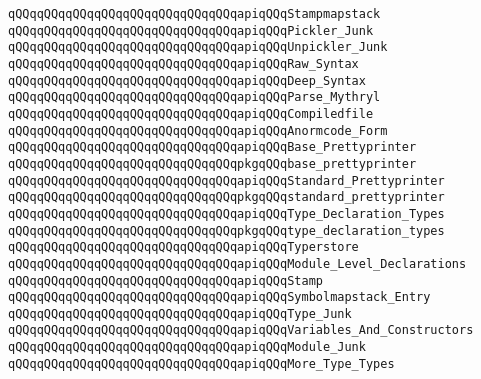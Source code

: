 \verb|qQQqqQQqqQQqqQQqqQQqqQQqqQQqqQQqapiqQQqStampmapstack|\newline
\verb|qQQqqQQqqQQqqQQqqQQqqQQqqQQqqQQqapiqQQqPickler_Junk|\newline
\verb|qQQqqQQqqQQqqQQqqQQqqQQqqQQqqQQqapiqQQqUnpickler_Junk|\newline
\verb|qQQqqQQqqQQqqQQqqQQqqQQqqQQqqQQqapiqQQqRaw_Syntax|\newline
\verb|qQQqqQQqqQQqqQQqqQQqqQQqqQQqqQQqapiqQQqDeep_Syntax|\newline
\verb|qQQqqQQqqQQqqQQqqQQqqQQqqQQqqQQqapiqQQqParse_Mythryl|\newline
\verb|qQQqqQQqqQQqqQQqqQQqqQQqqQQqqQQqapiqQQqCompiledfile|\newline
\verb|qQQqqQQqqQQqqQQqqQQqqQQqqQQqqQQqapiqQQqAnormcode_Form|\newline
\newline
\verb|qQQqqQQqqQQqqQQqqQQqqQQqqQQqqQQqapiqQQqBase_Prettyprinter|\newline
\verb|qQQqqQQqqQQqqQQqqQQqqQQqqQQqqQQqpkgqQQqbase_prettyprinter|\newline
\newline
\verb|qQQqqQQqqQQqqQQqqQQqqQQqqQQqqQQqapiqQQqStandard_Prettyprinter|\newline
\verb|qQQqqQQqqQQqqQQqqQQqqQQqqQQqqQQqpkgqQQqstandard_prettyprinter|\newline
\newline
\verb|qQQqqQQqqQQqqQQqqQQqqQQqqQQqqQQqapiqQQqType_Declaration_Types|\newline
\verb|qQQqqQQqqQQqqQQqqQQqqQQqqQQqqQQqpkgqQQqtype_declaration_types|\newline
\newline
\verb|qQQqqQQqqQQqqQQqqQQqqQQqqQQqqQQqapiqQQqTyperstore|\newline
\verb|qQQqqQQqqQQqqQQqqQQqqQQqqQQqqQQqapiqQQqModule_Level_Declarations|\newline
\verb|qQQqqQQqqQQqqQQqqQQqqQQqqQQqqQQqapiqQQqStamp|\newline
\verb|qQQqqQQqqQQqqQQqqQQqqQQqqQQqqQQqapiqQQqSymbolmapstack_Entry|\newline
\verb|qQQqqQQqqQQqqQQqqQQqqQQqqQQqqQQqapiqQQqType_Junk|\newline
\verb|qQQqqQQqqQQqqQQqqQQqqQQqqQQqqQQqapiqQQqVariables_And_Constructors|\newline
\verb|qQQqqQQqqQQqqQQqqQQqqQQqqQQqqQQqapiqQQqModule_Junk|\newline
\verb|qQQqqQQqqQQqqQQqqQQqqQQqqQQqqQQqapiqQQqMore_Type_Types|\newline
